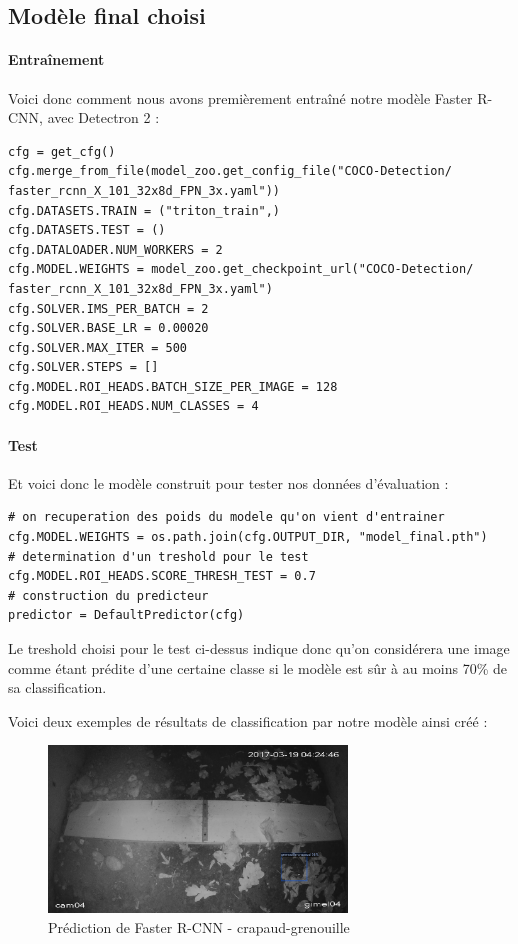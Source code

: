 \subsection{Modèle final choisi}

\paragraph{Entraînement}

Voici donc comment nous avons premièrement entraîné notre modèle Faster R-CNN, avec Detectron 2 : 

\lstset{language=Python}
\begin{lstlisting}
cfg = get_cfg()
cfg.merge_from_file(model_zoo.get_config_file("COCO-Detection/
faster_rcnn_X_101_32x8d_FPN_3x.yaml"))
cfg.DATASETS.TRAIN = ("triton_train",)
cfg.DATASETS.TEST = ()
cfg.DATALOADER.NUM_WORKERS = 2
cfg.MODEL.WEIGHTS = model_zoo.get_checkpoint_url("COCO-Detection/
faster_rcnn_X_101_32x8d_FPN_3x.yaml")  
cfg.SOLVER.IMS_PER_BATCH = 2 
cfg.SOLVER.BASE_LR = 0.00020 
cfg.SOLVER.MAX_ITER = 500 
cfg.SOLVER.STEPS = []   
cfg.MODEL.ROI_HEADS.BATCH_SIZE_PER_IMAGE = 128  
cfg.MODEL.ROI_HEADS.NUM_CLASSES = 4 
\end{lstlisting}


\paragraph{Test}

Et voici donc le modèle construit pour tester nos données d'évaluation : 

\lstset{language=Python}
\begin{lstlisting}
# on recuperation des poids du modele qu'on vient d'entrainer
cfg.MODEL.WEIGHTS = os.path.join(cfg.OUTPUT_DIR, "model_final.pth")  
# determination d'un treshold pour le test
cfg.MODEL.ROI_HEADS.SCORE_THRESH_TEST = 0.7  
# construction du predicteur
predictor = DefaultPredictor(cfg)
\end{lstlisting}

Le treshold choisi pour le test ci-dessus indique donc qu'on considérera une image comme étant prédite d'une certaine classe si le modèle est sûr à au moins 70\% de sa classification.\newline

Voici deux exemples de résultats de classification par notre modèle ainsi créé :

\begin{figure}[H]
    \centering
    \includegraphics[width=300px]{images/Eval_FasterRCNN_crapGren.png}
    \caption{Prédiction de Faster R-CNN - crapaud-grenouille}
    \label{fig:fasterRcnn_crapGren}
\end{figure}

